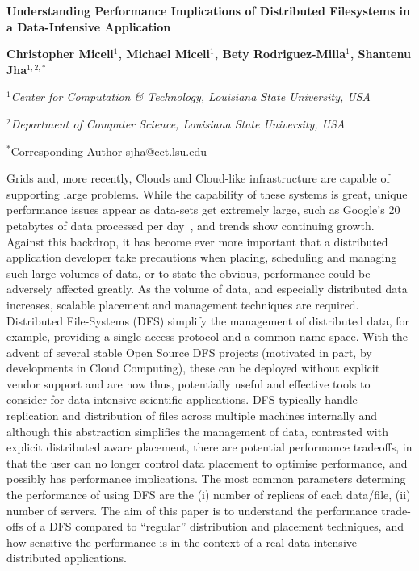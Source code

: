 \documentclass[a4paper,11pt]{article}
\begin{document}
\begin{center}

\textbf{\large Understanding Performance Implications of Distributed Filesystems in a Data-Intensive Application}

\vspace{0.05in}

\textbf{Christopher Miceli$^{1}$, Michael Miceli$^{1}$, Bety Rodriguez-Milla$^{1}$, Shantenu Jha$^{1,2,*}$}

\small{\emph{$^{1}$Center for Computation \& Technology, Louisiana State University, USA}}

\small{\emph{$^{2}$Department of Computer Science, Louisiana State University, USA}}

{\footnotesize {\hspace{0.0 in} $^*$Corresponding Author sjha@cct.lsu.edu}}

\end{center}


Grids and, more recently, Clouds and Cloud-like infrastructure are capable of supporting large problems. While the capability of these systems is great, unique performance issues appear as data-sets get extremely large, such as Google's 20 petabytes of data processed per day~\cite{google}, and trends show continuing growth. Against this backdrop, it has become ever more important that a distributed application developer take precautions when placing, scheduling and managing such large volumes of data, or to state the obvious, performance could be adversely affected greatly. As the volume of data, and especially distributed data increases, scalable placement and management techniques are required.  Distributed File-Systems (DFS) simplify the management of distributed data, for example, providing a single access protocol and a common name-space. With the advent of several stable Open Source DFS projects (motivated in part, by developments in Cloud Computing), these can be deployed without explicit vendor support and are now thus, potentially useful and effective tools to consider for data-intensive scientific applications.  DFS typically handle replication and distribution of files across multiple machines internally and although this abstraction simplifies the management of data, contrasted with explicit distributed aware placement, there are potential performance tradeoffs, in that the user can no longer control data placement to optimise performance, and possibly has performance implications.  The most common parameters determing the performance of using DFS are the (i) number of replicas of each data/file, (ii) number of servers. The aim of this paper is to understand the performance trade-offs of a DFS compared to ``regular'' distribution and placement techniques, and how sensitive the performance is in the context of a real data-intensive distributed applications.
\end{document}
